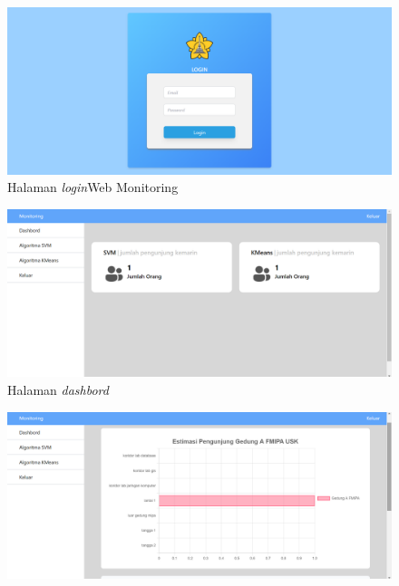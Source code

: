 \begin{enumerate}[a.]
	      \vspace{-0cm}
	      \begin{figure}[H]
		      \center
		      \includegraphics [width = 13.5 cm, height= 6.75 cm]{gambar/web/Login}
		      \caption{Halaman \textit{login}Web Monitoring}
		      \label{LoginWeb}
	      \end{figure}
	      \begin{figure}[H]
		      \center
		      \includegraphics [width = 13.5 cm, height= 6.75 cm]{gambar/web/Dashbord}
		      \caption{Halaman \textit{dashbord}}
		      \label{Dashbord}
	      \end{figure}
	      \begin{figure}[H]
		      \center
		      \includegraphics [width = 13.5 cm, height= 6.75 cm]{gambar/web/Estimasi_Grafik}

\end{figure}
\end{enumerate}
